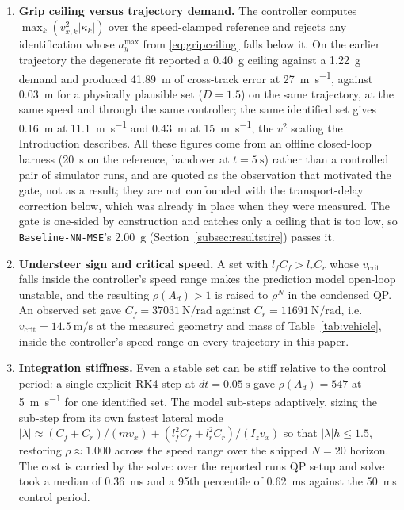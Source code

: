 \begin{enumerate}
\item \textbf{Grip ceiling versus trajectory demand.} The controller computes
$\max_{k}(v_{x,k}^{2}|\kappa_{k}|)$ over the speed-clamped reference and
rejects any identification whose $a_{y}^{\max}$ from \eqref{eq:gripceiling}
falls below it. On the earlier trajectory the degenerate fit reported a
\SI{0.40}{\g} ceiling against a \SI{1.22}{\g} demand and produced
\SI{41.89}{\meter} of cross-track error at \SI{27}{\meter\per\second},
against \SI{0.03}{\meter} for a physically plausible set ($D=\num{1.5}$) on the
same trajectory, at the same speed and through the same controller; the same
identified set gives \SI{0.16}{\meter} at \SI{11.1}{\meter\per\second} and
\SI{0.43}{\meter} at \SI{15}{\meter\per\second}, the $v^{2}$ scaling the
Introduction describes. All these figures come from an offline closed-loop
harness (\SI{20}{\second} on the reference, handover at $t=\SI{5}{\second}$)
rather than a controlled pair of simulator runs, and are quoted as the
observation that motivated the gate, not as a result; they are not confounded
with the transport-delay correction below, which was already in place when they
were measured. The gate is one-sided by construction and catches only a ceiling
that is too low, so \texttt{Baseline-NN-MSE}'s \SI{2.00}{\g}
(Section~\ref{subsec:resultstire}) passes it.
\item \textbf{Understeer sign and critical speed.} A set with
$l_{f}C_{f}>l_{r}C_{r}$ whose $v_{\mathrm{crit}}$ falls inside the controller's
speed range makes the prediction model open-loop unstable, and the resulting
$\rho(A_{d})>1$ is raised to $\rho^{N}$ in the condensed QP. An observed set
gave $C_{f}=\SI{37031}{\newton\per\radian}$ against
$C_{r}=\SI{11691}{\newton\per\radian}$, i.e.\
$v_{\mathrm{crit}}=\SI{14.5}{\meter\per\second}$ at the measured geometry and
mass of Table~\ref{tab:vehicle}, inside the controller's speed range on every
trajectory in this paper.
\item \textbf{Integration stiffness.} Even a stable set can be stiff relative
to the control period: a single explicit RK4 step at $dt=\SI{0.05}{\second}$
gave $\rho(A_{d})=547$ at \SI{5}{\meter\per\second} for one identified set. The
model sub-steps adaptively, sizing the sub-step from its own fastest lateral
mode
$|\lambda|\approx(C_{f}+C_{r})/(mv_{x})+(l_{f}^{2}C_{f}+l_{r}^{2}C_{r})/(I_{z}v_{x})$
so that $|\lambda|h\le1.5$, restoring $\rho\approx1.000$ across the speed range
over the shipped $N=20$ horizon. The cost is carried by the solve: over the
reported runs QP setup and solve took a median of \SI{0.36}{\milli\second} and
a 95th percentile of \SI{0.62}{\milli\second} against the
\SI{50}{\milli\second} control period.
\end{enumerate}

